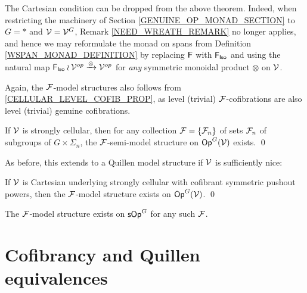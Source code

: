 \documentclass[a4paper,10pt]{article}%
\begin{document}
\begin{remark}
  The Cartesian condition can be dropped from the above theorem. Indeed, when restricting the machinery of Section \ref{GENUINE_OP_MONAD_SECTION} to $G = *$ and $\mathcal V = \mathcal V^G$, Remark \ref{NEED_WREATH_REMARK} no longer applies, and hence we may reformulate the monad on spans from Definition \ref{WSPAN_MONAD_DEFINITION} by replacing $\mathsf{F}$ with $\mathsf{F}_{\mathsf{Iso}}$ and using the natural map $\mathsf F_{\mathsf{Iso}} \wr \mathcal V^{op} \xrightarrow{\otimes} \mathcal V^{op}$ for \textit{any} symmetric monoidal product $\otimes$ on $\mathcal V$.
\end{remark}

Again, the $\mathcal F$-model structures also follows from \ref{CELLULAR_LEVEL_COFIB_PROP}, as level (trivial) $\mathcal F$-cofibrations are also level (trivial) genuine cofibrations.
\begin{corollary} 
  \label{F_OP_SEMI_MODEL_THM}
  If $\mathcal V$ is strongly cellular, then for any collection $\mathcal F = \left\{\mathcal F_n\right\}$ of sets $\mathcal F_n$ of subgroups of $G\times \Sigma_n$, the $\mathcal F$-semi-model structure on $\mathsf{Op}^G(\mathcal V)$ exists. \qed
\end{corollary} 


As before, this extends to a Quillen model structure if $\mathcal V$ is sufficiently nice:
\begin{theorem}
  \label{F_OP_Q_MODEL_THM}
  If $\mathcal V$ is Cartesian underlying strongly cellular with cofibrant symmetric pushout powers,%
then the $\mathcal F$-model structure exists on $\mathsf{Op}^G(\mathcal V)$. \qed
\end{theorem}

\begin{example}
  The $\mathcal F$-model structure exists on $\mathsf{sOp}^G$ for any such $\mathcal F$. 
\end{example}





\section{Cofibrancy and Quillen equivalences}\label{COFIB SEC}
\end{document}
